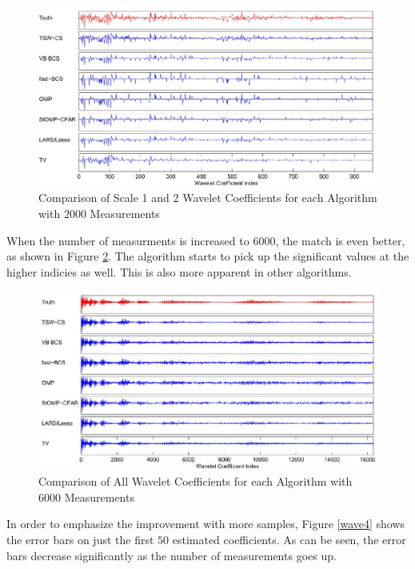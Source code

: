 \documentclass{IEEEtran}
\begin{document}
\begin{figure}[ht]
  \centering
  \includegraphics[width=1\linewidth]{he_carin_wavelet_s1and2}
  \caption{Comparison of Scale 1 and 2 Wavelet Coefficients for each Algorithm with $2000$ Measurements}
  \label{wave2}
\end{figure}

When the number of measurments is increased to $6000$, the match is
even better, as shown in Figure \ref{wave3}.  The algorithm starts to
pick up the significant values at the higher indicies as well.  This
is also more apparent in other algorithms.

\begin{figure}[ht]
  \centering
  \includegraphics[width=1\linewidth]{he_carin_wavelet_6000}
  \caption{Comparison of All Wavelet Coefficients for each Algorithm
    with $6000$ Measurements}
  \label{wave3}
\end{figure}

In order to emphasize the improvement with more samples, Figure
\ref{wave4} shows the error bars on just the first $50$ estimated
coefficients.  As can be seen, the error bars decrease significantly
as the number of measurements goes up.
\end{document}
